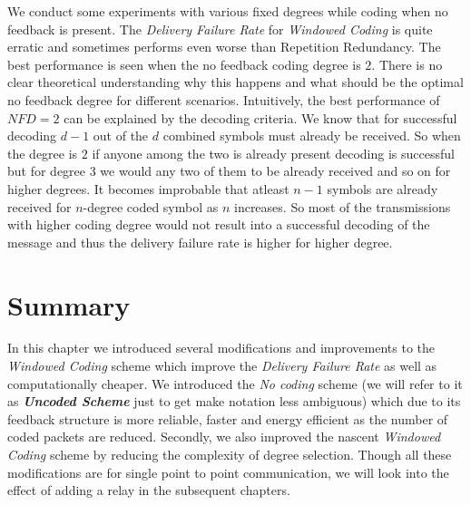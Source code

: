 We conduct some experiments with various fixed degrees while coding when no feedback is present. The \textit{Delivery Failure Rate} for \textit{Windowed Coding} is quite erratic and sometimes performs even worse than Repetition Redundancy. The best performance is seen when the no feedback coding degree is $2$. There is no clear theoretical understanding why this happens and what should be the optimal no feedback degree for different scenarios. Intuitively, the best performance of $NFD = 2$ can be explained by the decoding criteria. We know that for successful decoding $d-1$ out of the $d$ combined symbols must already be received. So when the degree is $2$ if anyone among the two is already present decoding is successful but for degree $3$ we would any two of them to be already received and so on for higher degrees. It becomes improbable that atleast $n-1$ symbols are already received for $n$-degree coded symbol as $n$ increases. So most of the transmissions with higher coding degree would not result into a successful decoding of the message and thus the delivery failure rate is higher for higher degree.




\section{Summary}
In this chapter we introduced several modifications and improvements to the \textit{Windowed Coding} scheme which improve the \textit{Delivery Failure Rate} as well as computationally cheaper. We introduced the \textit{No coding} scheme (we will refer to it as \textbf{\textit{Uncoded Scheme}} just to get make notation less ambiguous) which due to its feedback structure is more reliable, faster and energy efficient as the number of coded packets are reduced. Secondly, we also improved the nascent \textit{Windowed Coding} scheme by reducing the complexity of degree selection. Though all these modifications are for single point to point communication, we will look into the effect of adding a relay in the subsequent chapters.



